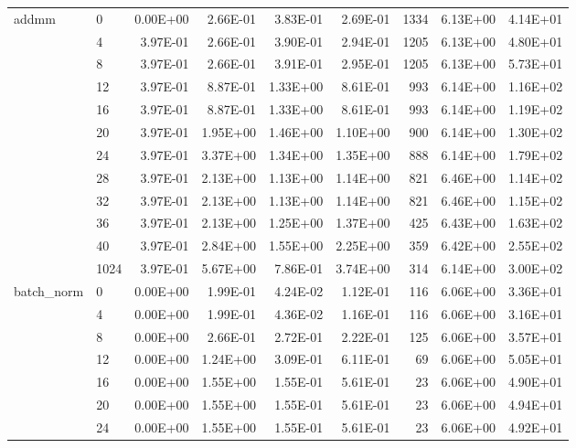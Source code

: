 \begin{longtable}{llrrrrrrr}
\bottomrule
\endlastfoot
addmm & 0    &   0.00E+00 & 2.66E-01 & 3.83E-01 & 2.69E-01 &    1334 &     6.13E+00 & 4.14E+01 \\
         & 4    &   3.97E-01 & 2.66E-01 & 3.90E-01 & 2.94E-01 &    1205 &     6.13E+00 & 4.80E+01 \\
         & 8    &   3.97E-01 & 2.66E-01 & 3.91E-01 & 2.95E-01 &    1205 &     6.13E+00 & 5.73E+01 \\
         & 12   &   3.97E-01 & 8.87E-01 & 1.33E+00 & 8.61E-01 &     993 &     6.14E+00 & 1.16E+02 \\
         & 16   &   3.97E-01 & 8.87E-01 & 1.33E+00 & 8.61E-01 &     993 &     6.14E+00 & 1.19E+02 \\
         & 20   &   3.97E-01 & 1.95E+00 & 1.46E+00 & 1.10E+00 &     900 &     6.14E+00 & 1.30E+02 \\
         & 24   &   3.97E-01 & 3.37E+00 & 1.34E+00 & 1.35E+00 &     888 &     6.14E+00 & 1.79E+02 \\
         & 28   &   3.97E-01 & 2.13E+00 & 1.13E+00 & 1.14E+00 &     821 &     6.46E+00 & 1.14E+02 \\
         & 32   &   3.97E-01 & 2.13E+00 & 1.13E+00 & 1.14E+00 &     821 &     6.46E+00 & 1.15E+02 \\
         & 36   &   3.97E-01 & 2.13E+00 & 1.25E+00 & 1.37E+00 &     425 &     6.43E+00 & 1.63E+02 \\
         & 40   &   3.97E-01 & 2.84E+00 & 1.55E+00 & 2.25E+00 &     359 &     6.42E+00 & 2.55E+02 \\
         & 1024 &   3.97E-01 & 5.67E+00 & 7.86E-01 & 3.74E+00 &     314 &     6.14E+00 & 3.00E+02 \\
batch\_norm & 0    &   0.00E+00 & 1.99E-01 & 4.24E-02 & 1.12E-01 &     116 &     6.06E+00 & 3.36E+01 \\
         & 4    &   0.00E+00 & 1.99E-01 & 4.36E-02 & 1.16E-01 &     116 &     6.06E+00 & 3.16E+01 \\
         & 8    &   0.00E+00 & 2.66E-01 & 2.72E-01 & 2.22E-01 &     125 &     6.06E+00 & 3.57E+01 \\
         & 12   &   0.00E+00 & 1.24E+00 & 3.09E-01 & 6.11E-01 &      69 &     6.06E+00 & 5.05E+01 \\
         & 16   &   0.00E+00 & 1.55E+00 & 1.55E-01 & 5.61E-01 &      23 &     6.06E+00 & 4.90E+01 \\
         & 20   &   0.00E+00 & 1.55E+00 & 1.55E-01 & 5.61E-01 &      23 &     6.06E+00 & 4.94E+01 \\
         & 24   &   0.00E+00 & 1.55E+00 & 1.55E-01 & 5.61E-01 &      23 &     6.06E+00 & 4.92E+01 \\

\end{longtable}
